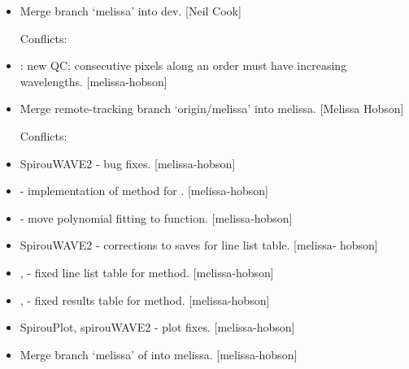 \documentclass[a4paper,10pt,english]{report}
\begin{document}
\begin{itemize}
\item {} 
Merge branch ‘melissa’ into dev. {[}Neil Cook{]}
\begin{description}
\item[{Conflicts:}] \leavevmode
{}

\end{description}

\item {} 
: new QC: consecutive pixels along an order must have
increasing wavelengths. {[}melissa-hobson{]}

\item {} 
Merge remote-tracking branch ‘origin/melissa’ into melissa. {[}Melissa
Hobson{]}
\begin{description}
\item[{Conflicts:}] \leavevmode
{}

\end{description}

\item {} 
SpirouWAVE2 - bug fixes. {[}melissa-hobson{]}

\item {} 
 - implementation of  method for
. {[}melissa-hobson{]}

\item {} 
 - move polynomial fitting to function. {[}melissa-hobson{]}

\item {} 
SpirouWAVE2 - corrections to saves for line list table. {[}melissa-
hobson{]}

\item {} 
,  - fixed line list table for 
method. {[}melissa-hobson{]}

\item {} 
,  - fixed results table for 
method. {[}melissa-hobson{]}

\item {} 
SpirouPlot, spirouWAVE2 - plot fixes. {[}melissa-hobson{]}

\item {} 
Merge branch ‘melissa’ of  into
melissa. {[}melissa-hobson{]}


\end{itemize}
\end{document}
